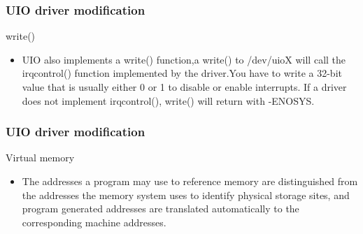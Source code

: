\documentclass{beamer}
\begin{document}
\begin{frame}
\frametitle{UIO driver modification}
write()
\centering \\
\begin{itemize}
\item UIO also implements a write() function,a write() to /dev/uioX will call the irqcontrol() function implemented by the driver.You have to write a 32-bit value that is usually either 0 or 1 to disable or enable interrupts. If a driver does not implement irqcontrol(), write() will return with -ENOSYS. 
\end{itemize}
\end{frame}


\begin{frame}
\frametitle{UIO driver modification}
\centering Virtual memory 
\centering \\
\begin{itemize}
\item The addresses a program may use to reference memory are distinguished from the addresses the memory system uses to identify physical storage sites, and program generated addresses are translated automatically to the corresponding machine addresses.
\end{itemize}
\end{frame}
\end{document}
